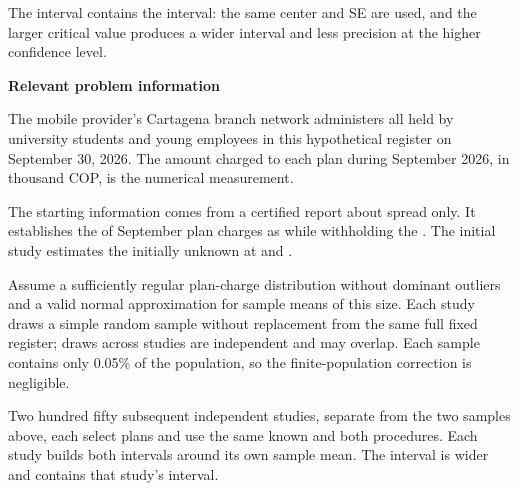 The  interval contains the  interval: the same center and SE are used, and the larger critical value produces a wider interval and less precision at the higher confidence level.

\secInicio[][sec:p2]

\clearpage



\textbf{Relevant problem information}

\begin{probleminfoexcerpt}
The mobile provider's Cartagena branch network administers all      held by university students and young employees in this hypothetical register on September 30, 2026. The amount charged to each plan during September 2026, in thousand COP, is the numerical measurement.
\end{probleminfoexcerpt}

\begin{probleminfoexcerpt}
The starting information comes from a certified report about spread only. It establishes the    of September plan charges as    while withholding the  . The initial study estimates the initially unknown   at  and  .
\end{probleminfoexcerpt}

\begin{probleminfoexcerpt}
Assume a sufficiently regular plan-charge distribution without dominant outliers and a valid normal approximation for sample means of this size. Each study draws a simple random sample without replacement from the same full fixed register; draws across studies are independent and may overlap. Each sample contains only 0.05\% of the population, so the finite-population correction is negligible.
\end{probleminfoexcerpt}

\begin{probleminfoexcerpt}
Two hundred fifty subsequent independent studies, separate from the two samples above, each select  plans and use the same known    and both  procedures. Each study builds both intervals around its own sample mean. The  interval is wider and contains that study's  interval.
\end{probleminfoexcerpt}

